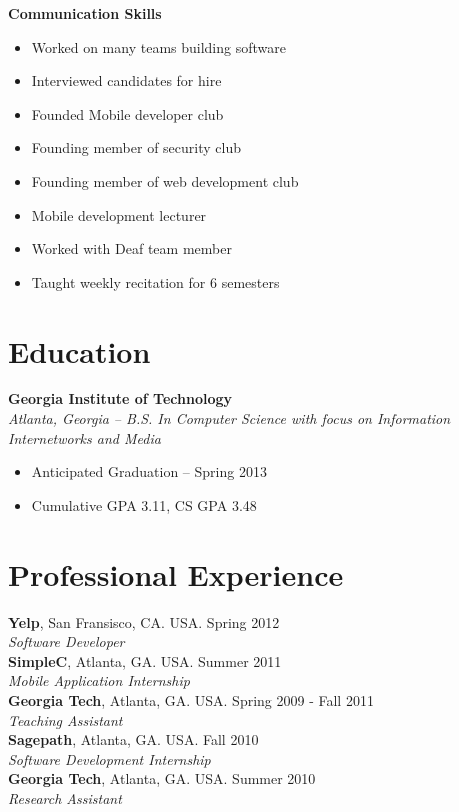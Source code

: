 \documentclass[margin,line]{res}
\begin{document}
\begin{resume}
 {\bf Communication Skills}
    \begin{itemize}
    \item Worked on many teams building software
    \item Interviewed candidates for hire
    \item Founded Mobile developer club
    \item Founding member of security club
    \item Founding member of web development club
    \item Mobile development lecturer
    \item Worked with Deaf team member
    \item Taught weekly recitation for 6 semesters
    \end{itemize}

\section{\sc Education}
    {\bf Georgia Institute of Technology}\\
    {\em Atlanta, Georgia -- B.S. In Computer Science with focus on
      Information Internetworks and Media}
    \begin{itemize}
    \item Anticipated Graduation -- Spring 2013
    \item Cumulative GPA 3.11, CS GPA 3.48
    \end{itemize}

\section{\sc Professional Experience}
    {\bf Yelp}, San Fransisco, CA. USA. \hfill{Spring 2012}\\
    {\em Software Developer}\hfill\\
    {\bf SimpleC}, Atlanta, GA. USA. \hfill{Summer 2011}\\
    {\em Mobile Application Internship} \\
    {\bf Georgia Tech}, Atlanta, GA. USA. \hfill{Spring 2009 - Fall 2011}\\
    {\em Teaching Assistant} \\
    {\bf Sagepath}, Atlanta, GA. USA. \hfill{Fall 2010}\\
    {\em Software Development Internship} \\
    {\bf Georgia Tech}, Atlanta, GA. USA. \hfill{Summer 2010}\\
    {\em Research Assistant} \\

\end{resume}
\end{document}
